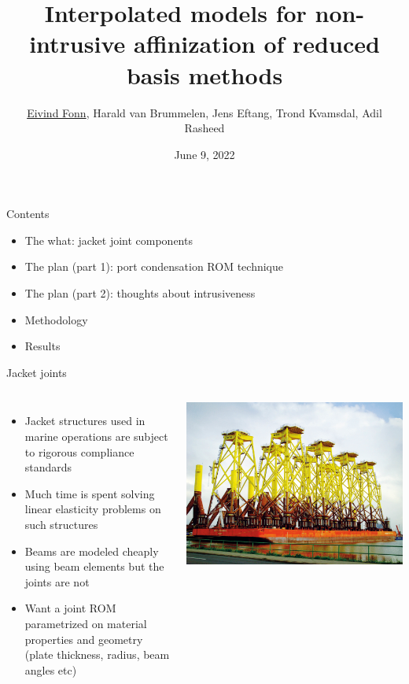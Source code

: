 \documentclass{sintefbeamer}
\title{Interpolated models for non-intrusive affinization of reduced basis methods}
\author{\href{mailto:eivind.fonn@sintef.no}{Eivind Fonn}, Harald van Brummelen, Jens Eftang, Trond Kvamsdal, Adil Rasheed}
\date{June 9, 2022}
\begin{document}
\maketitle

\begin{frame}{Contents}
    \begin{itemize}
        \item The what: jacket joint components
        \item The plan (part 1): port condensation ROM technique
        \item The plan (part 2): thoughts about intrusiveness
        \item Methodology
        \item Results
    \end{itemize}
\end{frame}

\begin{frame}{Jacket joints}
    \begin{columns}
        \begin{itemize}
            \item Jacket structures used in marine operations are subject to rigorous compliance standards
            \item Much time is spent solving linear elasticity problems on such structures
            \item Beams are modeled cheaply using beam elements but the joints are not
            \item Want a joint ROM parametrized on material properties and geometry (plate thickness, radius, beam angles etc)
        \end{itemize}
        \includegraphics[height=0.7\textheight,trim={12cm 15cm 40cm 0},clip]{images/jacket.jpg}
    \end{columns}
\end{frame}
\end{document}
